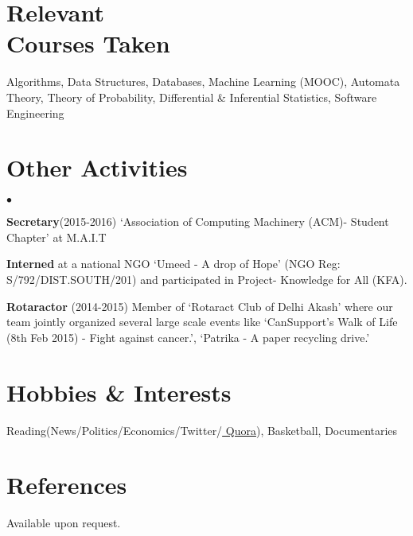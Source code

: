 \documentclass[margin,line]{res}
\newenvironment{list2}{
  \begin{list}{$\bullet$}{%
      \setlength{\itemsep}{0in}
      \setlength{\parsep}{0in} \setlength{\parskip}{0in}
      \setlength{\topsep}{0in} \setlength{\partopsep}{0in}
      \setlength{\leftmargin}{0.2in}}}{\end{list}}
\begin{document}
\begin{resume}
\section{\sc Relevant \\Courses Taken}
Algorithms, Data Structures, Databases, Machine Learning (MOOC), Automata Theory, Theory of Probability, Differential \& Inferential Statistics, Software Engineering
\section{\sc Other Activities}
\begin{list2}
\item {\bf Secretary}(2015-2016)  `Association of Computing Machinery (ACM)- Student Chapter' at M.A.I.T
\item {\bf Interned} at a national NGO `Umeed - A drop of Hope' (NGO Reg: S/792/DIST.SOUTH/201) and participated in Project- Knowledge for All (KFA).
\item {\bf Rotaractor} (2014-2015) Member of `Rotaract Club of Delhi Akash' where our team jointly organized several large scale events like `CanSupport's Walk of Life (8th Feb 2015) - Fight against cancer.', 
`Patrika - A paper recycling drive.'
\end{list2}
\section{\sc Hobbies \& Interests}
Reading(News/Politics/Economics/Twitter/{\href{https://www.quora.com/profile/Somin-Wadhwa}{\color{blue} Quora}}), Basketball, Documentaries
\section{\sc References }
Available upon request.
\end{resume}
\end{document}
